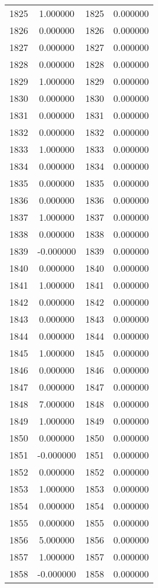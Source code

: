 \documentclass[12pt]{article}
\begin{document}
\begin{longtable}{@{}cccc@{}}
1825 & 1.000000 & 1825 & 0.000000 \\
1826 & 0.000000 & 1826 & 0.000000 \\
1827 & 0.000000 & 1827 & 0.000000 \\
1828 & 0.000000 & 1828 & 0.000000 \\
1829 & 1.000000 & 1829 & 0.000000 \\
1830 & 0.000000 & 1830 & 0.000000 \\
1831 & 0.000000 & 1831 & 0.000000 \\
1832 & 0.000000 & 1832 & 0.000000 \\
1833 & 1.000000 & 1833 & 0.000000 \\
1834 & 0.000000 & 1834 & 0.000000 \\
1835 & 0.000000 & 1835 & 0.000000 \\
1836 & 0.000000 & 1836 & 0.000000 \\
1837 & 1.000000 & 1837 & 0.000000 \\
1838 & 0.000000 & 1838 & 0.000000 \\
1839 & -0.000000 & 1839 & 0.000000 \\
1840 & 0.000000 & 1840 & 0.000000 \\
1841 & 1.000000 & 1841 & 0.000000 \\
1842 & 0.000000 & 1842 & 0.000000 \\
1843 & 0.000000 & 1843 & 0.000000 \\
1844 & 0.000000 & 1844 & 0.000000 \\
1845 & 1.000000 & 1845 & 0.000000 \\
1846 & 0.000000 & 1846 & 0.000000 \\
1847 & 0.000000 & 1847 & 0.000000 \\
1848 & 7.000000 & 1848 & 0.000000 \\
1849 & 1.000000 & 1849 & 0.000000 \\
1850 & 0.000000 & 1850 & 0.000000 \\
1851 & -0.000000 & 1851 & 0.000000 \\
1852 & 0.000000 & 1852 & 0.000000 \\
1853 & 1.000000 & 1853 & 0.000000 \\
1854 & 0.000000 & 1854 & 0.000000 \\
1855 & 0.000000 & 1855 & 0.000000 \\
1856 & 5.000000 & 1856 & 0.000000 \\
1857 & 1.000000 & 1857 & 0.000000 \\
1858 & -0.000000 & 1858 & 0.000000 \\

\end{longtable}
\end{document}
